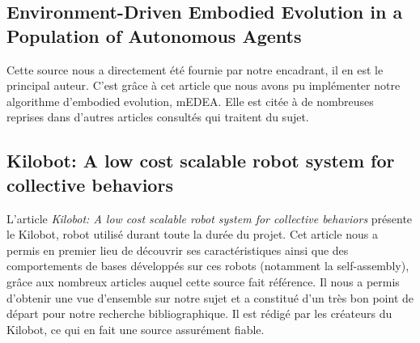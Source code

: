 \documentclass[a4paper]{article}
\begin{document}
\subsection{Environment-Driven Embodied Evolution in a Population of Autonomous Agents}

Cette source nous a directement été fournie par notre encadrant, il en est le principal auteur. C'est grâce à cet article que nous avons pu implémenter notre algorithme d'embodied evolution, mEDEA. Elle est citée à de nombreuses reprises dans d'autres articles consultés qui traitent du sujet.

\subsection{Kilobot: A low cost scalable robot system for collective behaviors}

L'article \textit{Kilobot: A low cost scalable robot system for collective behaviors} présente le Kilobot, robot utilisé durant toute la durée du projet. Cet article nous a permis en premier lieu de découvrir ses caractéristiques ainsi que des comportements de bases développés sur ces robots (notamment la self-assembly), grâce aux nombreux articles auquel cette source fait référence. Il nous a permis d'obtenir une vue d'ensemble sur notre sujet et a constitué d'un très bon point de départ pour notre recherche bibliographique. Il est rédigé par les créateurs du Kilobot, ce qui en fait une source assurément fiable.
\end{document}
